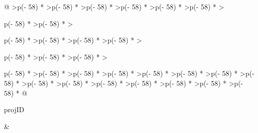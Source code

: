 \documentclass[
]{article}
\begin{document}
\begin{longtable}[]{@{}
  >{\raggedleft\arraybackslash}p{(\columnwidth - 58\tabcolsep) * }
  >{\raggedleft\arraybackslash}p{(\columnwidth - 58\tabcolsep) * }
  >{\raggedleft\arraybackslash}p{(\columnwidth - 58\tabcolsep) * }
  >{\raggedleft\arraybackslash}p{(\columnwidth - 58\tabcolsep) * }
  >{\raggedleft\arraybackslash}p{(\columnwidth - 58\tabcolsep) * }
  >{\raggedleft\arraybackslash}p{(\columnwidth - 58\tabcolsep) * }
  >{\raggedright\arraybackslash}p{(\columnwidth - 58\tabcolsep) * }
  >{\raggedleft\arraybackslash}p{(\columnwidth - 58\tabcolsep) * }
  >{\raggedright\arraybackslash}p{(\columnwidth - 58\tabcolsep) * }
  >{\raggedleft\arraybackslash}p{(\columnwidth - 58\tabcolsep) * }
  >{\raggedleft\arraybackslash}p{(\columnwidth - 58\tabcolsep) * }
  >{\raggedleft\arraybackslash}p{(\columnwidth - 58\tabcolsep) * }
  >{\raggedright\arraybackslash}p{(\columnwidth - 58\tabcolsep) * }
  >{\raggedleft\arraybackslash}p{(\columnwidth - 58\tabcolsep) * }
  >{\raggedleft\arraybackslash}p{(\columnwidth - 58\tabcolsep) * }
  >{\raggedright\arraybackslash}p{(\columnwidth - 58\tabcolsep) * }
  >{\raggedleft\arraybackslash}p{(\columnwidth - 58\tabcolsep) * }
  >{\raggedleft\arraybackslash}p{(\columnwidth - 58\tabcolsep) * }
  >{\raggedleft\arraybackslash}p{(\columnwidth - 58\tabcolsep) * }
  >{\raggedleft\arraybackslash}p{(\columnwidth - 58\tabcolsep) * }
  >{\raggedleft\arraybackslash}p{(\columnwidth - 58\tabcolsep) * }
  >{\raggedleft\arraybackslash}p{(\columnwidth - 58\tabcolsep) * }
  >{\raggedleft\arraybackslash}p{(\columnwidth - 58\tabcolsep) * }
  >{\raggedleft\arraybackslash}p{(\columnwidth - 58\tabcolsep) * }
  >{\raggedleft\arraybackslash}p{(\columnwidth - 58\tabcolsep) * }
  >{\raggedleft\arraybackslash}p{(\columnwidth - 58\tabcolsep) * }
  >{\raggedleft\arraybackslash}p{(\columnwidth - 58\tabcolsep) * }
  >{\raggedleft\arraybackslash}p{(\columnwidth - 58\tabcolsep) * }
  >{\raggedleft\arraybackslash}p{(\columnwidth - 58\tabcolsep) * }
  >{\raggedleft\arraybackslash}p{(\columnwidth - 58\tabcolsep) * }@{}}
\toprule\noalign{}
\begin{minipage}[b]{\linewidth}\raggedleft
projID
\end{minipage} & \begin{minipage}[b]{\linewidth}\raggedleft

\end{minipage}
\end{longtable}
\end{document}

